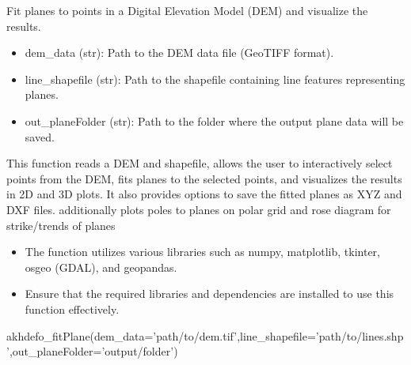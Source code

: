\documentclass[letterpaper,10pt,english]{sphinxmanual}
\begin{document}
\begin{fulllineitems}
\label{\detokenize{akhdefo_functions:akhdefo_functions.Akhdefo_Tools.akhdefo_fitPlane}}
\pysigstartsignatures
{}
\pysigstopsignatures
\sphinxAtStartPar
Fit planes to points in a Digital Elevation Model (DEM) and visualize the results.
\begin{description}
\begin{itemize}
\item {} 
\sphinxAtStartPar
dem\_data (str): Path to the DEM data file (GeoTIFF format).

\item {} 
\sphinxAtStartPar
line\_shapefile (str): Path to the shapefile containing line features representing planes.

\item {} 
\sphinxAtStartPar
out\_planeFolder (str): Path to the folder where the output plane data will be saved.

\end{itemize}

\sphinxAtStartPar
This function reads a DEM and shapefile, allows the user to interactively select points from the DEM,
fits planes to the selected points, and visualizes the results in 2D and 3D plots. It also provides options
to save the fitted planes as XYZ and DXF files. additionally plots poles to planes on polar grid and rose diagram for strike/trends of planes

\begin{itemize}
\item {} 
\sphinxAtStartPar
The function utilizes various libraries such as numpy, matplotlib, tkinter, osgeo (GDAL), and geopandas.

\item {} 
\sphinxAtStartPar
Ensure that the required libraries and dependencies are installed to use this function effectively.

\end{itemize}

\sphinxAtStartPar
akhdefo\_fitPlane(dem\_data=’path/to/dem.tif’,line\_shapefile=’path/to/lines.shp’,out\_planeFolder=’output/folder’)

\end{description}

\end{fulllineitems}
\end{document}
